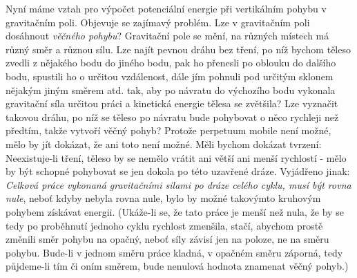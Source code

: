 {    Nyní máme vztah pro výpočet potenciální energie při vertikálním pohybu v gravitačním poli. 
    Objevuje se zajímavý problém. Lze v gravitačním poli dosáhnout \emph{věčného pohybu}? 
    Gravitační pole se mění, na různých místech má různý směr a různou sílu. Lze najít pevnou dráhu 
    bez tření, po níž bychom těleso zvedli z nějakého bodu do jiného bodu, pak ho přenesli po 
    oblouku do dalšího bodu, spustili ho o určitou vzdálenost, dále jím pohnuli pod určitým sklonem 
    nějakým jiným směrem atd. tak, aby po návratu do výchozího bodu vykonala gravitační síla 
    určitou práci a kinetická energie tělesa se zvětšila? Lze vyznačit takovou dráhu, po níž se 
    těleso po návratu bude pohybovat o něco rychleji než předtím, takže vytvoří věčný pohyb? 
    Protože perpetuum mobile není možné, mělo by jít dokázat, že ani toto není možné. Měli bychom 
    dokázat tvrzení: Neexistuje-li tření, těleso by se nemělo vrátit ani větší ani menší rychlostí 
    - mělo by být schopné pohybovat se jen dokola po této uzavřené dráze. Vyjádřeno jinak: 
    \emph{Celková práce vykonaná gravitačními silami po dráze celého cyklu, musí být rovna nule}, 
    neboť kdyby nebyla rovna nule, bylo by možné takovýmto kruhovým pohybem získávat energii. 
    (Ukáže-li se, že tato práce je menší než nula, že by se tedy po proběhnutí jednoho cyklu 
    rychlost zmenšila, stačí, abychom prostě změnili směr pohybu na opačný, neboť síly závisí jen 
    na poloze, ne na směru pohybu. Bude-li v jednom směru práce kladná, v opačném směru záporná, 
    tedy půjdeme-li tím či oním směrem, bude nenulová hodnota znamenat věčný pohyb.)
    
}
